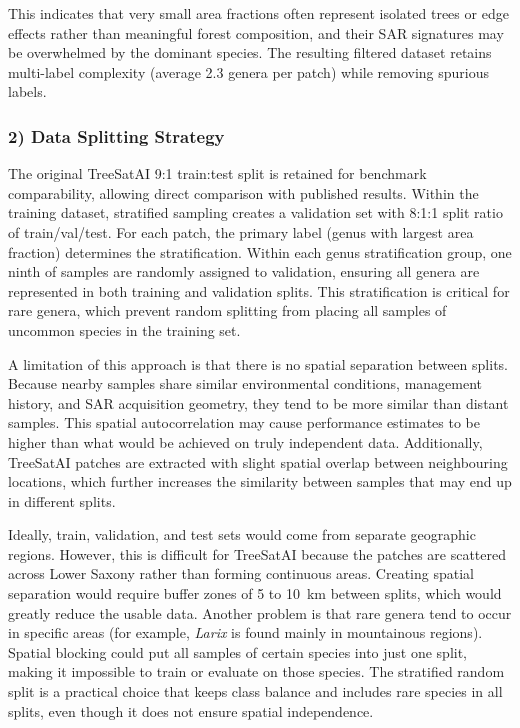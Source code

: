 This indicates that very small area fractions often represent isolated trees or edge effects rather than meaningful forest composition, and their SAR signatures may be overwhelmed by the dominant species. The resulting filtered dataset retains multi-label complexity (average \num{2.3} genera per patch) while removing spurious labels.

\subsubsection{2) Data Splitting Strategy}

The original TreeSatAI 9:1 train:test split is retained for benchmark comparability, allowing direct comparison with published results. Within the training dataset, stratified sampling creates a validation set with 8:1:1 split ratio of train/val/test. For each patch, the primary label (genus with largest area fraction) determines the stratification. Within each genus stratification group, one ninth of samples are randomly assigned to validation, ensuring all genera are represented in both training and validation splits. This stratification is critical for rare genera, which prevent random splitting from placing all samples of uncommon species in the training set.

A limitation of this approach is that there is no spatial separation between splits. Because nearby samples share similar environmental conditions, management history, and SAR acquisition geometry, they tend to be more similar than distant samples. This spatial autocorrelation may cause performance estimates to be higher than what would be achieved on truly independent data. Additionally, TreeSatAI patches are extracted with slight spatial overlap between neighbouring locations, which further increases the similarity between samples that may end up in different splits.

Ideally, train, validation, and test sets would come from separate geographic regions. However, this is difficult for TreeSatAI because the patches are scattered across Lower Saxony rather than forming continuous areas. Creating spatial separation would require buffer zones of 5 to 10~km between splits, which would greatly reduce the usable data. Another problem is that rare genera tend to occur in specific areas (for example, \textit{Larix} is found mainly in mountainous regions). Spatial blocking could put all samples of certain species into just one split, making it impossible to train or evaluate on those species. The stratified random split is a practical choice that keeps class balance and includes rare species in all splits, even though it does not ensure spatial independence.

